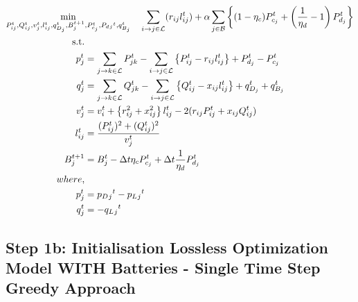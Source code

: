\begin{gather}
    \min_{P_{ij}^t, Q_{ij}^t, v_{j}^t, l_{ij}^t, q_{D_j}^t, B_{j}^{t+1},
	P_{c_j}^t, P_d{_j}^t, q_{B_j}^t} \quad
	\sum_{\fromto{i, j} \in \mathcal{L}} (r_{ij}l_{ij}^t) + 
	\alpha \sum_{j \in \mathcal{B}} \left\{ (1- \eta_c)P_{c_j}^t + \left(\frac{1}{\eta_d}-1\right) P_{d_j}^t \right\} \\
	\begin{align}
		\text{s.t.} & {}\nonumber \\
		{p_j^t} & = {\sum_{\fromto{j,k} \in \mathcal{L}} P_{jk}^t - \sum_{\fromto{i,j} \in \mathcal{L}}\left\{P_{ij}^t - r_{ij}l_{ij}^t\right\} + P_{d_j}^t - P_{c_j}^t} && \\
		{q_j^t} & = {\sum_{\fromto{j,k} \in \mathcal{L}} Q_{jk}^t - \sum_{\fromto{i,j} \in \mathcal{L}}\left\{Q_{ij}^t - x_{ij}l_{ij}^t\right\} + q_{D_j}^t + q_{B_j}^t} && \\
		{v_j^t} & = {v_{i}^t +  \left\{r_{ij}^2 + x_{ij}^2\right\}l_{ij}^t - 2(r_{ij}P_{ij}^t + x_{ij}Q_{ij}^t)} && \\
		{l_{ij}^t} & = {\frac{(P_{ij}^{t})^2 + (Q_{ij}^{t})^2}{v_j^t}} \\
		{B_{j}^{t+1}} &= {B_{j}^{t} - \Delta t  \eta_c P_{c_j}^t + \Delta t\frac{1}{\eta_d} P_{d_j}^t} \\
		{where,} & {} \\
		{p_j^t} &= {p_D{_j}^t - p_L{_j}^t} \\
		{q_j^t} &= {-q_L{_j}^t}
	\end{align}
\end{gather}

\subsection*{Step 1b: Initialisation Lossless Optimization Model WITH Batteries - Single Time Step Greedy Approach}


